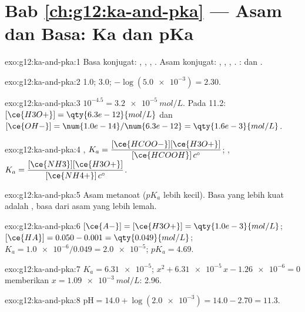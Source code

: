 \section*{Bab \ref{ch:g12:ka-and-pka} --- Asam dan Basa: Ka dan pKa}

\begin{solution}{exo:g12:ka-and-pka:1}
Basa konjugat: , , , . Asam
konjugat: , , , . : 
dan .
\end{solution}

\begin{solution}{exo:g12:ka-and-pka:2}
 1.0; 3.0; $-\log(\num{5.0e-3}) = 2.30$.
\end{solution}

\begin{solution}{exo:g12:ka-and-pka:3}
$10^{-4.5} = \qty{3.2e-5}{mol/L}$. Pada  11.2:
$[\ce{H3O+}] = \qty{6.3e-12}{mol/L}$ dan
$[\ce{OH-}] = \num{1.0e-14}/\num{6.3e-12} = \qty{1.6e-3}{mol/L}$.
\end{solution}

\begin{solution}{exo:g12:ka-and-pka:4}
,
$K_a = \dfrac{[\ce{HCOO-}][\ce{H3O+}]}{[\ce{HCOOH}]\,c^\circ}$;
,
$K_a = \dfrac{[\ce{NH3}][\ce{H3O+}]}{[\ce{NH4+}]\,c^\circ}$.
\end{solution}

\begin{solution}{exo:g12:ka-and-pka:5}
Asam metanoat ($pK_a$ lebih kecil). Basa yang lebih kuat adalah
, basa dari asam yang lebih lemah.
\end{solution}

\begin{solution}{exo:g12:ka-and-pka:6}
$[\ce{A-}] = [\ce{H3O+}] = \qty{1.0e-3}{mol/L}$;
$[\ce{HA}] = 0.050 - 0.001 = \qty{0.049}{mol/L}$;
$K_a = \num{1.0e-6}/0.049 = \num{2.0e-5}$; $pK_a = 4.69$.
\end{solution}

\begin{solution}{exo:g12:ka-and-pka:7}
$K_a = \num{6.31e-5}$; $x^2 + \num{6.31e-5}\,x - \num{1.26e-6} = 0$
memberikan $x = \qty{1.09e-3}{mol/L}$:  2.96.
\end{solution}

\begin{solution}{exo:g12:ka-and-pka:8}
$\mathrm{pH} = 14.0 + \log(\num{2.0e-3}) = 14.0 - 2.70 = 11.3$.
\end{solution}

